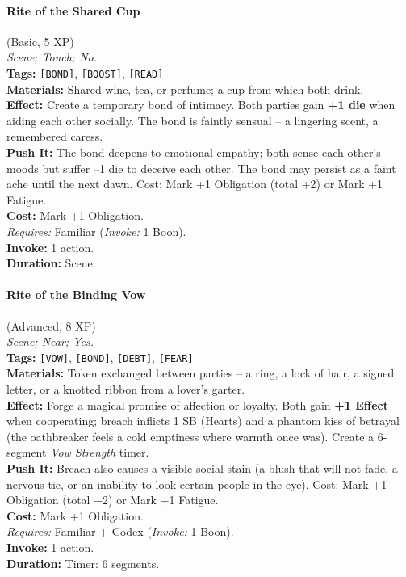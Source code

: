 \paragraph{Rite of the Shared Cup} (Basic, 5 XP) \hfill \\
\emph{Scene; Touch; No.} \\
\textbf{Tags:} \texttt{[BOND]}, \texttt{[BOOST]}, \texttt{[READ]} \\
\textbf{Materials:} Shared wine, tea, or perfume; a cup from which both drink. \\
\textbf{Effect:} Create a temporary bond of intimacy. Both parties gain \textbf{+1 die} when aiding each other socially. The bond is faintly sensual -- a lingering scent, a remembered caress. \\
\textbf{Push It:} The bond deepens to emotional empathy; both sense each other's moods but suffer --1 die to deceive each other. The bond may persist as a faint ache until the next dawn. Cost: Mark +1 Obligation (total +2) or Mark +1 Fatigue. \\
\textbf{Cost:} Mark +1 Obligation. \\
\textit{Requires:} Familiar (\textit{Invoke:} 1 Boon). \\
\textbf{Invoke:} 1 action. \\
\textbf{Duration:} Scene.

\paragraph{Rite of the Binding Vow} (Advanced, 8 XP) \hfill \\
\emph{Scene; Near; Yes.} \\
\textbf{Tags:} \texttt{[VOW]}, \texttt{[BOND]}, \texttt{[DEBT]}, \texttt{[FEAR]} \\
\textbf{Materials:} Token exchanged between parties -- a ring, a lock of hair, a signed letter, or a knotted ribbon from a lover's garter. \\
\textbf{Effect:} Forge a magical promise of affection or loyalty. Both gain \textbf{+1 Effect} when cooperating; breach inflicts 1 SB (Hearts) and a phantom kiss of betrayal (the oathbreaker feels a cold emptiness where warmth once was). Create a 6-segment \textit{Vow Strength} timer. \\
\textbf{Push It:} Breach also causes a visible social stain (a blush that will not fade, a nervous tic, or an inability to look certain people in the eye). Cost: Mark +1 Obligation (total +2) or Mark +1 Fatigue. \\
\textbf{Cost:} Mark +1 Obligation. \\
\textit{Requires:} Familiar + Codex (\textit{Invoke:} 1 Boon). \\
\textbf{Invoke:} 1 action. \\
\textbf{Duration:} Timer: 6 segments.

